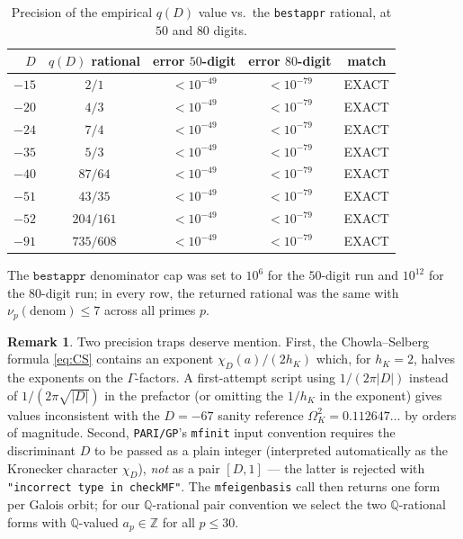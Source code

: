 \documentclass[11pt,a4paper]{amsart}
\theoremstyle{plain}
\theoremstyle{definition}
\newtheorem{remark}[theorem]{Remark}
\newcommand{\Q}{\mathbb{Q}}
\newcommand{\Z}{\mathbb{Z}}
\begin{document}
\begin{table}[h]
\centering
\caption{Precision of the empirical $q(D)$ value vs.\ the
\texttt{bestappr} rational, at $50$ and $80$ digits.}
\label{tab:precision}
\begin{tabular}{rcccc}
\toprule
$D$ & $q(D)$ rational & error $50$-digit
    & error $80$-digit & match\\
\midrule
$-15$ & $2/1$        & $< 10^{-49}$ & $< 10^{-79}$ & EXACT\\
$-20$ & $4/3$        & $< 10^{-49}$ & $< 10^{-79}$ & EXACT\\
$-24$ & $7/4$        & $< 10^{-49}$ & $< 10^{-79}$ & EXACT\\
$-35$ & $5/3$        & $< 10^{-49}$ & $< 10^{-79}$ & EXACT\\
$-40$ & $87/64$      & $< 10^{-49}$ & $< 10^{-79}$ & EXACT\\
$-51$ & $43/35$      & $< 10^{-49}$ & $< 10^{-79}$ & EXACT\\
$-52$ & $204/161$    & $< 10^{-49}$ & $< 10^{-79}$ & EXACT\\
$-91$ & $735/608$    & $< 10^{-49}$ & $< 10^{-79}$ & EXACT\\
\bottomrule
\end{tabular}
\end{table}

The $\texttt{bestappr}$ denominator cap was set to $10^6$ for the
$50$-digit run and $10^{12}$ for the $80$-digit run; in every row, the
returned rational was the same with $\nu_p(\mathrm{denom}) \leq 7$
across all primes $p$.

\begin{remark}\label{rk:precision-traps}
Two precision traps deserve mention. First, the Chowla--Selberg
formula \eqref{eq:CS} contains an exponent
$\chi_D(a)/(2 h_K)$ which, for $h_K = 2$, halves the exponents on the
$\Gamma$-factors. A first-attempt script using
$1/(2\pi |D|)$ instead of $1/(2\pi \sqrt{|D|})$ in the prefactor
(or omitting the $1/h_K$ in the exponent) gives values
inconsistent with the $D = -67$ sanity reference
$\Omega_K^2 = 0.112647 \dots$ by orders of magnitude.
Second, \texttt{PARI/GP}'s \texttt{mfinit} input convention requires the
discriminant $D$ to be passed as a plain integer (interpreted
automatically as the Kronecker character $\chi_D$), \emph{not} as a
pair $[D, 1]$ — the latter is rejected with \texttt{"incorrect type in
checkMF"}. The \texttt{mfeigenbasis} call then returns one form per
Galois orbit; for our $\Q$-rational pair convention we select the two
$\Q$-rational forms with $\Q$-valued $a_p \in \Z$ for all $p \leq 30$.
\end{remark}
\end{document}
